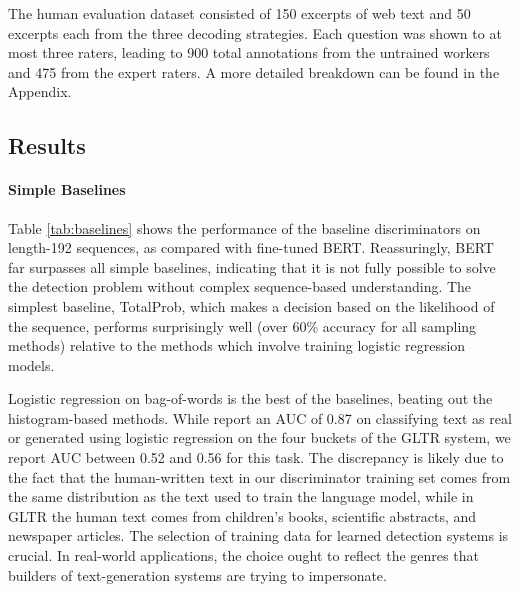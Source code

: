 The human evaluation dataset consisted of 150 excerpts of web text and 50 excerpts each from the three decoding strategies.
Each question was shown to at most three raters, leading to 900 total annotations from the untrained workers and 475 from the expert raters.
A more detailed breakdown can be found in the Appendix.


\subsection{Results}
\label{section:auto_detection}
\paragraph{Simple Baselines}
Table \ref{tab:baselines} shows the performance of the baseline discriminators on length-192 sequences, as compared with fine-tuned BERT.
Reassuringly, BERT far surpasses all simple baselines, indicating that it is not fully possible to solve the detection problem without complex sequence-based understanding.
The simplest baseline, TotalProb, which makes a decision based on the likelihood of the sequence, performs surprisingly well (over 60\% accuracy for all sampling methods) relative to the methods which involve training logistic regression models.

Logistic regression on bag-of-words is the best of the baselines, beating out the histogram-based methods.
While \citet{gehrmann2019gltr} report an AUC of 0.87 on classifying text as real or generated using logistic regression on the four buckets of the GLTR system, we report AUC between 0.52 and 0.56 for this task.
The discrepancy is likely due to the fact that the human-written text in our discriminator training set comes from the same distribution as the text used to train the language model, while in GLTR the human text comes from children's books, scientific abstracts, and newspaper articles. 
The selection of training data for learned detection systems is crucial. In real-world applications, the choice ought to reflect the genres that builders of text-generation systems are trying to impersonate. 

